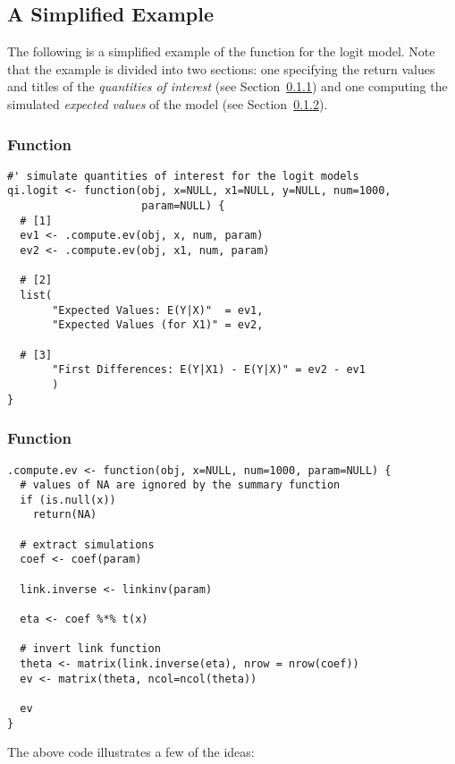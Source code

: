 \pagebreak
\subsection{A Simplified Example}

The following is a simplified example of the  function for the logit model. Note that the example is divided into two sections: one specifying the return values and titles of the \emph{quantities of interest} (see Section~\ref{example:qi.logit}) and one computing the simulated \emph{expected values} of the model (see Section~\ref{example:.compute.ev}).


\subsubsection{ Function}\label{example:qi.logit}
\begin{verbatim}
#' simulate quantities of interest for the logit models
qi.logit <- function(obj, x=NULL, x1=NULL, y=NULL, num=1000,
                     param=NULL) {
  # [1]
  ev1 <- .compute.ev(obj, x, num, param)
  ev2 <- .compute.ev(obj, x1, num, param)

  # [2]
  list(
       "Expected Values: E(Y|X)"  = ev1,
       "Expected Values (for X1)" = ev2,
       
  # [3]
       "First Differences: E(Y|X1) - E(Y|X)" = ev2 - ev1
       )
}
\end{verbatim}


\subsubsection{ Function}\label{example:.compute.ev}
\begin{verbatim}
.compute.ev <- function(obj, x=NULL, num=1000, param=NULL) {
  # values of NA are ignored by the summary function
  if (is.null(x))
    return(NA)

  # extract simulations
  coef <- coef(param)
  
  link.inverse <- linkinv(param)

  eta <- coef %*% t(x)

  # invert link function
  theta <- matrix(link.inverse(eta), nrow = nrow(coef))
  ev <- matrix(theta, ncol=ncol(theta))

  ev
}  
\end{verbatim}

\noindent The above code illustrates a few of the ideas:

